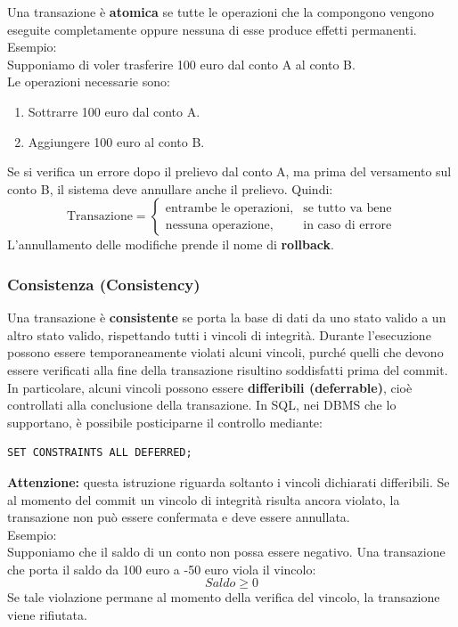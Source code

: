 Una transazione è \textbf{atomica} se tutte le operazioni
che la compongono vengono eseguite completamente oppure
nessuna di esse produce effetti permanenti.\\
\textcolor{verdeEsempio}{Esempio:}\\
Supponiamo di voler trasferire 100 euro dal conto A
al conto B.\\
Le operazioni necessarie sono:
\begin{enumerate}
    \item Sottrarre 100 euro dal conto A.
    \item Aggiungere 100 euro al conto B.
\end{enumerate}
\noindent Se si verifica un errore dopo il prelievo dal conto A,
ma prima del versamento sul conto B, il sistema deve
annullare anche il prelievo.
Quindi:
\[
\text{Transazione} =
\begin{cases}
\text{entrambe le operazioni}, & \text{se tutto va bene}\\
\text{nessuna operazione}, & \text{in caso di errore}
\end{cases}
\]
L'annullamento delle modifiche prende il nome di
\textbf{rollback}.
\subsubsection{Consistenza (Consistency)}
Una transazione è \textbf{consistente} se porta la base
di dati da uno stato valido a un altro stato valido,
rispettando tutti i vincoli di integrità.
Durante l'esecuzione possono essere temporaneamente
violati alcuni vincoli, purché quelli che devono essere
verificati alla fine della transazione risultino
soddisfatti prima del commit.
In particolare, alcuni vincoli possono essere
\textbf{differibili (deferrable)}, cioè controllati
alla conclusione della transazione.
In SQL, nei DBMS che lo supportano, è possibile
posticiparne il controllo mediante:
\begin{verbatim}
SET CONSTRAINTS ALL DEFERRED;
\end{verbatim}
\textbf{Attenzione:} questa istruzione riguarda
soltanto i vincoli dichiarati differibili.
Se al momento del commit un vincolo di integrità
risulta ancora violato, la transazione non può
essere confermata e deve essere annullata.\\
\textcolor{verdeEsempio}{Esempio:}\\
Supponiamo che il saldo di un conto non possa essere
negativo.
Una transazione che porta il saldo da 100 euro
a -50 euro viola il vincolo:
\[
Saldo \geq 0
\]
Se tale violazione permane al momento della verifica
del vincolo, la transazione viene rifiutata.
